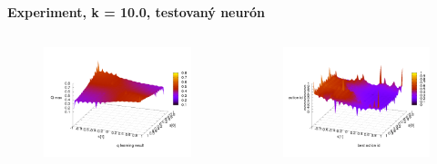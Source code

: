 \documentclass[xcolor=dvipsnames]{beamer}
\begin{document}
\begin{frame}{\bf Experiment, k = 10.0, testovaný neurón}

\begin{columns}
	\begin{column}{0.5\textwidth}

        \begin{figure}[ht]

        \begin{center}
        \includegraphics[width=1.0\textwidth]{experiment_03/testing_neuron/q_map.png}
        \end{center}

        \end{figure}

	\end{column}
	\begin{column}{0.5\textwidth}

        \begin{figure}[ht]

        \begin{center}
        \includegraphics[width=1.0\textwidth]{experiment_03/testing_neuron/q_action_id.png}
        \end{center}


\end{figure}
\end{column}
\end{columns}
\end{frame}
\end{document}
